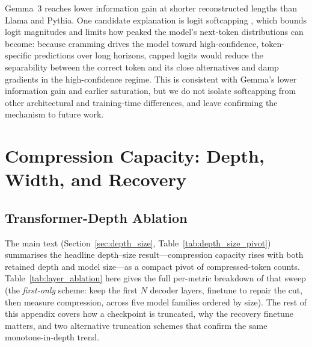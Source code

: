 Gemma~3 reaches lower information gain at shorter reconstructed lengths than Llama and Pythia. One candidate explanation is logit softcapping \cite{gemma2}, which bounds logit magnitudes and limits how peaked the model's next-token distributions can become: because cramming drives the model toward high-confidence, token-specific predictions over long horizons, capped logits would reduce the separability between the correct token and its close alternatives and damp gradients in the high-confidence regime. This is consistent with Gemma's lower information gain and earlier saturation, but we do not isolate softcapping from other architectural and training-time differences, and leave confirming the mechanism to future work.


\section{Compression Capacity: Depth, Width, and Recovery}
\label{app:part_capacity}

\subsection{Transformer-Depth Ablation}
\label{app:layer_ablation}

The main text (Section~\ref{sec:depth_size}, Table~\ref{tab:depth_size_pivot}) summarises the headline depth--size result---compression capacity rises with both retained depth and model size---as a compact pivot of compressed-token counts. Table~\ref{tab:layer_ablation} here gives the full per-metric breakdown of that sweep (the \emph{first-only} scheme: keep the first $N$ decoder layers, finetune to repair the cut, then measure compression, across five model families ordered by size). The rest of this appendix covers how a checkpoint is truncated, why the recovery finetune matters, and two alternative truncation schemes that confirm the same monotone-in-depth trend.

\begin{table}[t]
    \centering
    \caption{Compression capacity vs.\ network depth and model size (full breakdown of the main-text pivot, Table~\ref{tab:depth_size_pivot}). Each pretrained model (name annotated with its total decoder-layer count) is truncated to its first $N$ decoder layers, recovered by a short causal-LM finetune on fineweb-edu, and evaluated with progressive cramming (PG19, $50$ samples, sequence length $4096$, $\mathrm{lr}=0.1$, random per-sample initialization); ``full'' is the untruncated model. ``Compressed Tokens'' is the achieved prefix length $n$, ``Trajectory Length'' is $L_{\text{traj}}$, and ``PCA 99\%'' is the number of principal components explaining 99\% of trajectory variance. Compression rises monotonically with both retained depth (within each family) and model size (across families at matched depth).}
    \label{tab:layer_ablation}
    \begin{small}
    
    \end{small}
\vskip -0.1in
\end{table}


